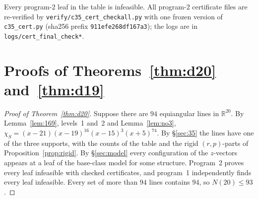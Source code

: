 \documentclass[11pt]{article}
\theoremstyle{definition}
\newcommand{\R}{\mathbb{R}}
\begin{document}
Every program-$2$ leaf in the table is infeasible. All program-$2$ certificate files are re-verified by \texttt{verify/c35\_cert\_checkall.py} with one frozen
version of \texttt{c35\_cert.py} (sha256 prefix \texttt{911efe268df167a3}); the logs are in
\texttt{logs/cert\_final\_check*}.

\section{\texorpdfstring{Proofs of Theorems~\ref{thm:d20} and~\ref{thm:d19}}{Proofs of Theorems 2 and 3}}\label{sec:d19}

\begin{proof}[Proof of Theorem~\ref{thm:d20}]
Suppose there are $94$ equiangular lines in $\R^{20}$. By Lemma~\ref{lem:169}, levels~1 and~2 and
Lemma~\ref{lem:no3}, $\chi_S=(x-21)(x-19)^{16}(x-15)^3(x+5)^{74}$. By \S\ref{sec:35} the lines have one of
the three supports, with the counts of the table and the rigid $(r,p)$-parts of
Proposition~\ref{prop:rigid}. By \S\ref{sec:model} every configuration of the $z$-vectors appears at a
leaf of the base-class model for some structure. Program~2 proves every leaf infeasible with checked
certificates, and program~1 independently finds every leaf infeasible. Every set of more than $94$ lines
contains $94$, so $N(20)\le93$.
\end{proof}
\end{document}
